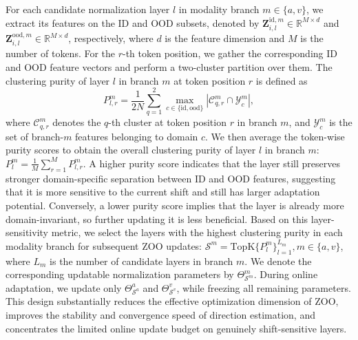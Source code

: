 For each candidate normalization layer $l$ in modality branch $m\in\{a,v\}$, we extract its features on the ID and OOD subsets, denoted by $\mathbf{Z}^{\mathrm{id},m}_{i,l}\in\mathbb{R}^{M\times d}$ and $\mathbf{Z}^{\mathrm{ood},m}_{i,l}\in\mathbb{R}^{M\times d}$, respectively, where $d$ is the feature dimension and $M$ is the number of tokens.
For the $r$-th token position, we gather the corresponding ID and OOD feature vectors and perform a two-cluster partition over them.
The clustering purity of layer $l$ in branch $m$ at token position $r$ is defined as
\begin{equation}
\label{eq:token_purity}
P_{l,r}^{m}
=
\frac{1}{2N}
\sum_{q=1}^{2}
\max_{c\in\{\mathrm{id},\mathrm{ood}\}}
\left|
\mathcal C_{q,r}^{m}\cap \mathcal Y_c^{m}
\right|,
\end{equation}
where $\mathcal C_{q,r}^{m}$ denotes the $q$-th cluster at token position $r$ in branch $m$, and $\mathcal Y_c^{m}$ is the set of branch-$m$ features belonging to domain $c$. We then average the token-wise purity scores to obtain the overall clustering purity of layer $l$ in branch $m$: $P_l^{m}=\frac{1}{M}\sum_{r=1}^{M}P_{l,r}^{m}$.
A higher purity score indicates that the layer still preserves stronger domain-specific separation between ID and OOD features, suggesting that it is more sensitive to the current shift and still has larger adaptation potential.
Conversely, a lower purity score implies that the layer is already more domain-invariant, so further updating it is less beneficial.
Based on this layer-sensitivity metric, we select the layers with the highest clustering purity in each modality branch for subsequent ZOO updates:
$\mathcal S^{m}=\mathrm{TopK}\{P_l^{m}\}_{l=1}^{L_m}, m\in\{a,v\}$, where $L_m$ is the number of candidate layers in branch $m$.
We denote the corresponding updatable normalization parameters by $\Theta_{\mathcal S^m}^{m}$.
During online adaptation, we update only $\Theta_{\mathcal S^a}^{a}$ and $\Theta_{\mathcal S^v}^{v}$, while freezing all remaining parameters.
This design substantially reduces the effective optimization dimension of ZOO, improves the stability and convergence speed of direction estimation, and concentrates the limited online update budget on genuinely shift-sensitive layers.


